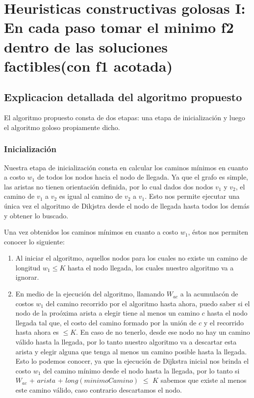 \section{Heuristicas constructivas golosas I: En cada paso tomar el minimo f2 dentro de las soluciones factibles(con f1 acotada)}
\subsection{Explicacion detallada del algoritmo propuesto}

El algoritmo propuesto consta de dos etapas: una etapa de inicializaci\'on y luego el algoritmo goloso propiamente dicho.

\subsubsection{Inicializaci\'on}

Nuestra etapa de inicializaci\'on consta en calcular los caminos m\'inimos en cuanto a costo $w_1$ de todos los nodos hacia el nodo de llegada. Ya que el grafo es simple, las aristas no tienen orientaci\'on definida, por lo cual dados dos nodos $v_1$ y $v_2$, el camino de $v_1$ a $v_2$ es igual al camino de $v_2$ a $v_1$. Esto nos permite ejecutar una \'unica vez el algoritmo de Dikjstra desde el nodo de llegada hasta todos los dem\'as y obtener lo buscado.

\vspace{2mm}

Una vez obtenidos los caminos m\'inimos en cuanto a costo $w_1$, \'estos nos permiten conocer lo siguiente:

\begin{enumerate}
\item Al iniciar el algoritmo, aquellos nodos para los cuales no existe un camino de longitud $w_1 \leq K$ hasta el nodo llegada, los cuales nuestro algoritmo va a ignorar.
\item En medio de la ejecuci\'on del algoritmo, llamando $W_{ac}$ a la acumulac\'on de costos $w_1$ del camino recorrido por el algoritmo hasta ahora, puedo saber si el nodo de la pro\'oxima arista a elegir tiene al menos un camino $c$ hasta el nodo llegada tal que, el costo del camino formado por la uni\'on de $c$ y el recorrido hasta ahora es $\leq K$. En caso de no tenerlo, desde ese nodo no hay un camino v\'alido hasta la llegada, por lo tanto nuestro algoritmo va a descartar esta arista y elegir alguna que tenga al menos un camino posible hasta la llegada. Esto lo podemos conocer, ya que la ejecuci\'on de Dijkstra inicial nos brinda el costo $w_1$ del camino m\'inimo desde el nodo hasta la llegada, por lo tanto  si $W_{ac}$ + $arista$ + $long(minimoCamino)$ $\leq$ $K$ sabemos que existe al menos este camino v\'alido, caso contrario descartamos el nodo.
\end{enumerate}

